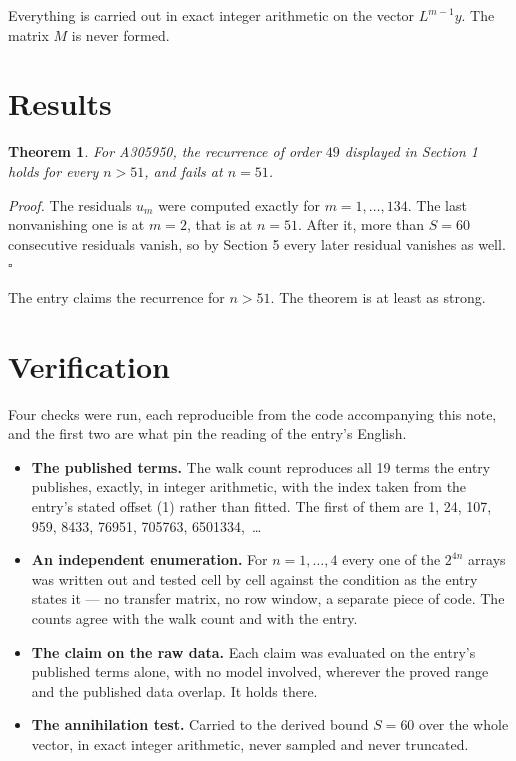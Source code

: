 \documentclass[11pt]{article}
\newtheorem{theorem}{Theorem}
\theoremstyle{definition}
\begin{document}
Everything is carried out in exact integer arithmetic on the vector $L^{m-1}y$. The matrix $M$ is never formed.

\section{Results}

\begin{theorem} For A305950, the recurrence of order $49$ displayed in Section 1 holds for every $n > 51$, and fails at $n = 51$.\end{theorem}

{\itshape Proof.} The residuals $u_m$ were computed exactly for $m = 1,\dots,134$. The last nonvanishing one is at $m = 2$, that is at $n = 51$. After it, more than $S = 60$ consecutive residuals vanish, so by Section 5 every later residual vanishes as well. $\square$

The entry claims the recurrence for $n > 51$. The theorem is at least as strong.

\section{Verification}

Four checks were run, each reproducible from the code accompanying this note, and the first two are what pin the reading of the entry's English.

\begin{itemize}

\item {\bfseries The published terms.} The walk count reproduces all 19 terms the entry publishes, exactly, in integer arithmetic, with the index taken from the entry's stated offset (1) rather than fitted. The first of them are 1, 24, 107, 959, 8433, 76951, 705763, 6501334,~\dots

\item {\bfseries An independent enumeration.} For $n = 1,\dots,4$ every one of the $2^{4n}$ arrays was written out and tested cell by cell against the condition as the entry states it --- no transfer matrix, no row window, a separate piece of code. The counts agree with the walk count and with the entry.

\item {\bfseries The claim on the raw data.} Each claim was evaluated on the entry's published terms alone, with no model involved, wherever the proved range and the published data overlap. It holds there.

\item {\bfseries The annihilation test.} Carried to the derived bound $S = 60$ over the whole vector, in exact integer arithmetic, never sampled and never truncated.

\end{itemize}
\end{document}
